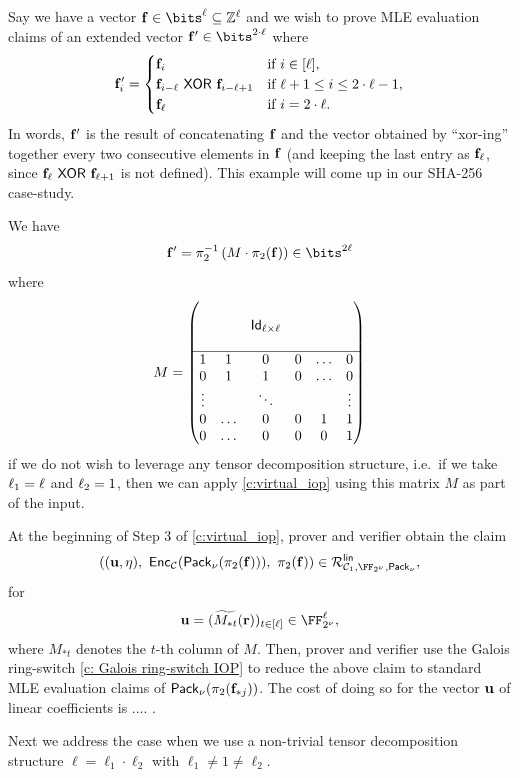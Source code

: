 \documentclass[11pt,letterpaper,usenames,dvipsnames]{article}
\begin{document}
\begin{example}\label{e:virtual_example}
    Say we have a vector $\bff\in \bits^{\codedim} \subseteq \ZZ^\codedim$ and we wish to prove MLE evaluation claims of an extended vector $\bff' \in \bits^{2\cdot \codedim}$ where 
    $$
    \mathbf{f}_i' = \begin{cases}
    \mathbf{f}_i  & \text{if } i \in [\ell],\\
    \mathbf{f}_{i -\ell } \ \mathsf{XOR}\  \mathbf{f}_{i - \ell +1} & \text{if } \ell+1 \leq i \leq 2\cdot \ell -1,\\
    \mathbf{f}_{\ell} & \text{if } i =2\cdot \ell.
    \end{cases}
    $$
    In words, $\mathbf{f}'$ is the result of concatenating $\mathbf{f}$ and the vector obtained by ``xor-ing'' together every two consecutive elements in $\mathbf{f}$ (and keeping the last entry as $\mathbf{f}_{\ell}$, since $\mathbf{f}_{\ell} \ \mathsf{XOR}\  \mathbf{f}_{\ell+1}$ is not defined). This example will come up in our SHA-256 case-study.

    
    We have
    $$
    \bff' = \pi_2^{-1}\left(M \cdot \pi_2(\bff)\right)   \in \bits^{2\codedim}
    $$
    where
    $$
M = \begin{pmatrix}
        & & & &\\
       & & \mathsf{Id}_{\ell\times \ell} & & \\
               & & & &\\
               \hline
        1 & 1 &  0 & 0 & \ldots & 0\\
        0 & 1 & 1 & 0 & \ldots & 0 \\
        \vdots & & \ddots & & & \vdots\\
        0 &  \ldots &  0 & 0 & 1 & 1 \\
        0 & \ldots & 0& 0 & 0 & 1 \\
    \end{pmatrix} 
    $$
     if we do not wish to leverage any tensor decomposition structure, i.e.\ if we take $\ell_1=\ell$ and $\ell_2=1$, then we can apply  \cref{c:virtual_iop} using this matrix $M$ as part of the input. 
     
     
     At the beginning of Step 3 of \cref{c:virtual_iop}, prover and verifier obtain the claim 
     $$
     \left((\uu, \eta),\ \Enc_{\cC}(\pack(\pi_2(\bff))), \ \pi_2(\bff)\right) \in \Relation^{\mathsf{lin}}_{\cC_1, \comfield,\pack},
     $$
     for  $$\uu = (\mle{M_{*t}}(\rr))_{t\in [\codedim]} \in \comfield^{\codedim},$$ where $M_{*t}$ denotes the $t$-th column of $M$. Then, prover and verifier use the Galois ring-switch \cref{c: Galois ring-switch IOP} to reduce the above claim to standard MLE evaluation claims of $\mathsf{Pack}_\nu(\pi_2(\mathbf{f}_{*j}))$. The cost of doing so for the vector $\mathbf{u}$ of linear coefficients is .... .
    
    Next we address the case when we use a non-trivial tensor decomposition structure $\ell= \ell_1 \cdot \ell_2$ with $\ell_1\neq 1 \neq \ell_2$. 
     
\end{example} 
\end{document}
